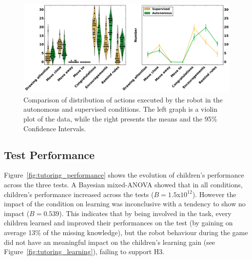 \begin{figure}[ht]
	\includegraphics[width=1\linewidth]{actions.pdf}
	\centering
	\caption{Comparison of distribution of actions executed by the robot in the autonomous and supervised conditions. The left graph is a violin plot of the data, while the right presents the means and the 95\% Confidence Intervals.}
	\label{fig:tutoring_actions_distribution}
\end{figure}


%


\subsection{Test Performance}

Figure~\ref{fig:tutoring_performance} shows the evolution of children's performance across the three tests. A Bayesian mixed-ANOVA showed that in all conditions, children's performance increased across the tests ($B=1.5$x$10^{12}$). However the impact of the condition on learning was inconclusive with a tendency to show no impact ($B=0.539$). This indicates that by being involved in the task, every children learned and improved their performances on the test (by gaining on average 13\% of the missing knowledge), but the robot behaviour during the game did not have an meaningful impact on the children's learning gain (see Figure~\ref{fig:tutoring_learning}), failing to support H3. %


